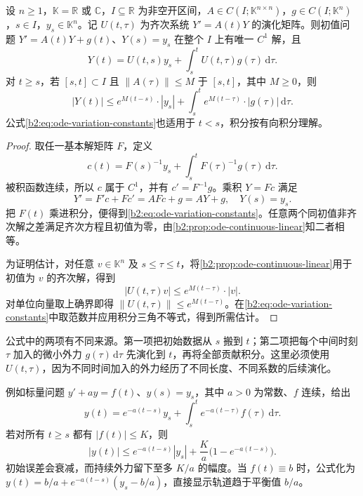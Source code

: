 \begin{theorem}[变常数公式]\label{b2:thm:ode-variation-constants}
设 \(n\geq1\)，\(\mathbb K=\mathbb R\) 或 \(\mathbb C\)，\(I\subseteq\mathbb R\) 为非空开区间，\(A\in C(I;\mathbb K^{n\times n})\)，\(g\in C(I;\mathbb K^n)\)，\(s\in I\)，\(y_s\in\mathbb K^n\)。记 \(U(t,\tau)\) 为齐次系统 \(Y'=A(t)Y\) 的演化矩阵。则初值问题 \(Y'=A(t)Y+g(t)\)、\(Y(s)=y_s\) 在整个 \(I\) 上有唯一 \(C^1\) 解，且
\begin{equation}\label{b2:eq:ode-variation-constants}
 Y(t)=U(t,s)y_s+\int_s^t U(t,\tau)g(\tau)\,\mathrm d\tau.
\end{equation}
对 \(t\geq s\)，若 \([s,t]\subset I\) 且 \(\|A(\tau)\|\leq M\) 于 \([s,t]\)，其中 \(M\geq0\)，则
\[
 |Y(t)|\leq e^{M(t-s)}\cdot|y_s|
 +\int_s^t e^{M(t-\tau)}\cdot|g(\tau)|\,\mathrm d\tau.
\]
公式\eqref{b2:eq:ode-variation-constants}也适用于 \(t<s\)，积分按有向积分理解。
\end{theorem}
\begin{proof}
取任一基本解矩阵 \(F\)，定义
\[
 c(t)=F(s)^{-1}y_s+\int_s^t F(\tau)^{-1}g(\tau)\,\mathrm d\tau.
\]
被积函数连续，所以 \(c\) 属于 \(C^1\)，并有 \(c'=F^{-1}g\)。乘积 \(Y=Fc\) 满足
\[
 Y'=F'c+Fc'=AFc+g=AY+g,\quad Y(s)=y_s.
\]
把 \(F(t)\) 乘进积分，便得到\eqref{b2:eq:ode-variation-constants}。任意两个同初值非齐次解之差满足齐次方程且初值为零，由\cref{b2:prop:ode-continuous-linear}知二者相等。

为证明估计，对任意 \(v\in\mathbb K^n\) 及 \(s\leq\tau\leq t\)，将\cref{b2:prop:ode-continuous-linear}用于初值为 \(v\) 的齐次解，得到
\[
 |U(t,\tau)v|\leq e^{M(t-\tau)}\cdot|v|.
\]
对单位向量取上确界即得 \(\|U(t,\tau)\|\leq e^{M(t-\tau)}\)。在\eqref{b2:eq:ode-variation-constants}中取范数并应用积分三角不等式，得到所需估计。
\end{proof}

公式中的两项有不同来源。第一项把初始数据从 \(s\) 搬到 \(t\)；第二项把每个中间时刻 \(\tau\) 加入的微小外力 \(g(\tau)\,\mathrm d\tau\) 先演化到 \(t\)，再将全部贡献积分。这里必须使用 \(U(t,\tau)\)，因为不同时间加入的外力经历了不同长度、不同系数的后续演化。

\ProseParagraphBreak

例如标量问题 \(y'+ay=f(t)\)、\(y(s)=y_s\)，其中 \(a>0\) 为常数、\(f\) 连续，给出
\[
 y(t)=e^{-a(t-s)}y_s+\int_s^t e^{-a(t-\tau)}f(\tau)\,\mathrm d\tau.
\]
若对所有 \(t\geq s\) 都有 \(|f(t)|\leq K\)，则
\[
 |y(t)|\leq e^{-a(t-s)}|y_s|+\frac{K}{a}\bigl(1-e^{-a(t-s)}\bigr).
\]
初始误差会衰减，而持续外力留下至多 \(K/a\) 的幅度。当 \(f(t)\equiv b\) 时，公式化为 \(y(t)=b/a+e^{-a(t-s)}(y_s-b/a)\)，直接显示轨道趋于平衡值 \(b/a\)。

